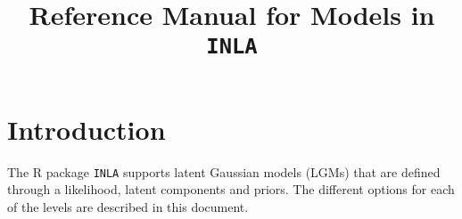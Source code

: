 \documentclass[12pt, a4paper]{book}
\begin{document}
\title{Reference Manual for Models in \texttt{INLA}}
\maketitle

\setcounter{tocdepth}{1}
\tableofcontents
\setcounter{tocdepth}{5}

\chapter{Introduction}
The \textsf{R} package \texttt{INLA} supports latent Gaussian models (LGMs)
that are defined through a likelihood, latent components and priors. The
different options for each of the levels are described in this document.





\end{document}
